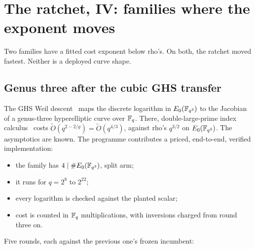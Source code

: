 \section{The ratchet, IV: families where the exponent moves}\label{sec:families}

Two families have a fitted cost exponent below rho's. On both, the ratchet
moved fastest. Neither is a deployed curve shape.

\subsection{Genus three after the cubic GHS transfer}

The GHS Weil descent~\cite{ghs2002} maps the discrete logarithm in
$E_0(\mathbb{F}_{q^3})$ to the Jacobian of a genus-three hyperelliptic curve over
$\mathbb{F}_q$. There, double-large-prime index calculus~\cite{gtthd2007} costs
$\tilde O(q^{2-2/g})=\tilde O(q^{4/3})$, against rho's $q^{3/2}$ on
$E_0(\mathbb{F}_{q^3})$. The asymptotics are known. The programme contributes a
priced, end-to-end, verified implementation:
\begin{itemize}
\item the family has $4\mid\#E_0(\mathbb{F}_{q^3})$, split arm;
\item it runs for $q=2^{8}$ to $2^{22}$;
\item every logarithm is checked against the planted scalar;
\item cost is counted in $\mathbb{F}_q$ multiplications, with inversions charged
  from round three on.
\end{itemize}
Five rounds, each against the previous one's frozen incumbent:

